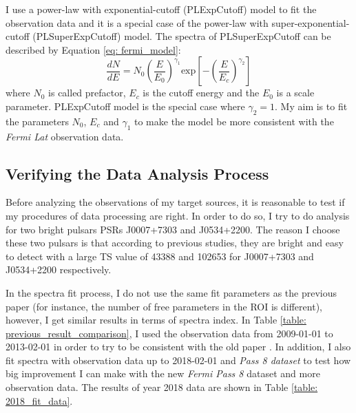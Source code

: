 \documentclass[12pt]{report}
\begin{document}
          I use a power-law with exponential-cutoff (PLExpCutoff) model to fit the 
          observation data and it is a special case of the power-law with 
          super-exponential-cutoff (PLSuperExpCutoff) model. The spectra of PLSuperExpCutoff 
          can be described by Equation \ref{eq: fermi_model}:  
          \begin{equation} 
            \label{eq: fermi_model}
            \frac{dN}{dE} = N_{0} \left(\frac{E}{E_0}\right)^{\gamma_1}\mbox{exp}\left[-\left(\frac{E}{E_c}\right)^{\gamma_2}\right]
          \end{equation}  
          where $N_0$ is called prefactor, $E_c$ is the cutoff energy and the $E_0$ is a scale 
          parameter. PLExpCutoff model is the special case where $\gamma_2=1$. My aim is to 
          fit the parameters $N_0$, $E_c$ and $\gamma_1$ to make the model be more 
          consistent with the \textit{Fermi Lat} observation data.

        \subsection{Verifying the Data Analysis Process}
          Before analyzing the observations of my target sources, it is reasonable to test 
          if my procedures of data processing are right. In order to do so, I try to do 
          analysis for two bright pulsars PSRs J0007+7303 and J0534+2200. The reason I choose 
          these two pulsars is that according to previous studies, they are bright and easy 
          to detect with a large TS value of 43388 and 102653 for J0007+7303 and J0534+2200 
          respectively. \cite{0067-0049-208-2-17} 

          In the spectra fit process, I do not use the same fit parameters as the previous 
          paper (for instance, the number of free parameters in the ROI is different), 
          however, I get similar results in terms of spectra index.  
          In Table \ref{table: previous_result_comparison}, I used the observation data from 
          2009-01-01 to 2013-02-01 in order to try to be consistent with the old paper 
          \cite{0067-0049-208-2-17}. In addition, I also fit spectra with observation data up 
          to 2018-02-01 and \textit{Pass 8 dataset} to test how big improvement I can make with 
          the new \textit{Fermi Pass 8} dataset and more observation data. 
          The results of year 2018 data are shown in Table \ref{table: 2018_fit_data}.
\end{document}
